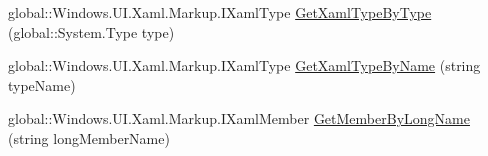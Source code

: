 \begin{DoxyCompactItemize}
\item 
global\+::\+Windows.\+U\+I.\+Xaml.\+Markup.\+I\+Xaml\+Type \hyperlink{class_eli_log_in_app_1_1_eli_log_in_app___xaml_type_info_1_1_xaml_type_info_provider_a3fbc82d96e692b9ee336a4a62c7a5de9}{Get\+Xaml\+Type\+By\+Type} (global\+::\+System.\+Type type)
\item 
global\+::\+Windows.\+U\+I.\+Xaml.\+Markup.\+I\+Xaml\+Type \hyperlink{class_eli_log_in_app_1_1_eli_log_in_app___xaml_type_info_1_1_xaml_type_info_provider_a0592b938104778ab5d79bb384c866521}{Get\+Xaml\+Type\+By\+Name} (string type\+Name)
\item 
global\+::\+Windows.\+U\+I.\+Xaml.\+Markup.\+I\+Xaml\+Member \hyperlink{class_eli_log_in_app_1_1_eli_log_in_app___xaml_type_info_1_1_xaml_type_info_provider_ab9c6cb03a69417e5a0703d644ff557a4}{Get\+Member\+By\+Long\+Name} (string long\+Member\+Name)
\end{DoxyCompactItemize}
